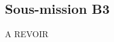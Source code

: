 \subsection{Sous-mission B3}

\begin{center}
\vspace{\fill}
{\Huge\color{red}A REVOIR}
\vspace{\fill}
\end{center}